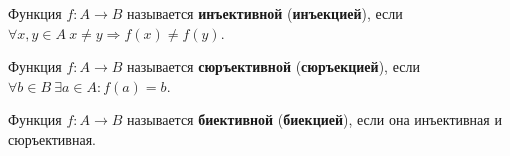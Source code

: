  Функция $f \colon A \to B$ называется \textbf{инъективной} (\textbf{инъекцией}), если
$\forall x, y \in A	\ x \neq y \Rightarrow f(x) \neq f(y)$.

 Функция $f \colon A \to B$ называется \textbf{сюръективной} (\textbf{сюръекцией}), если
$\forall b \in B \ \exists a \in A \colon f(a) = b$.

 Функция $f \colon A \to B$ называется \textbf{биективной} (\textbf{биекцией}), если она инъективная и сюръективная.